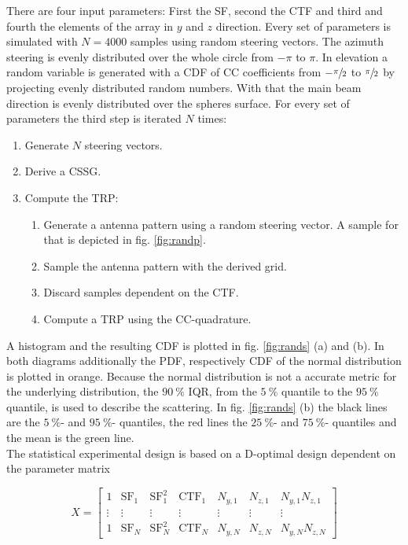 There are four input parameters: First the \ac{SF}, second the \ac{CTF} and third and fourth the elements of the array in $y$ and $z$ direction. Every set of parameters is simulated with $N=4000$ samples using random steering vectors. The azimuth steering is evenly distributed over the whole circle from $-\pi$ to $\pi$. In elevation a random variable is generated with a \ac{CDF} of \ac{CC} coefficients from $-\sfrac{\pi}{2}$ to $\sfrac{\pi}{2}$ by projecting evenly distributed random numbers. With that the main beam direction is evenly distributed over the spheres surface. For every set of parameters the third step is iterated $N$ times:

\begin{enumerate}
\item Generate $N$ steering vectors.
\item Derive a \ac{CSSG}.
\item Compute the \ac{TRP}:
\begin{enumerate}
\item Generate a antenna pattern using a random steering vector. A sample for that is depicted in fig. \ref{fig:randp}.
\item Sample the antenna pattern with the derived grid.
\item Discard samples dependent on the \ac{CTF}.
\item Compute a \ac{TRP} using the \ac{CC}-quadrature.
\end{enumerate}
\end{enumerate}

A histogram and the resulting \ac{CDF} is plotted in fig. \ref{fig:rands} (a) and (b). In both diagrams additionally the \ac{PDF}, respectively \ac{CDF} of the normal distribution is plotted in orange. Because the normal distribution is not a accurate metric for the underlying distribution, the $\SI{90}{\percent}$ \ac{IQR}, from the $\SI{5}{\percent}$ quantile to the $\SI{95}{\percent}$ quantile, is used to describe the scattering. In fig. \ref{fig:rands} (b) the black lines are the $\SI{5}{\percent}$- and $\SI{95}{\percent}$- quantiles, the red lines the $\SI{25}{\percent}$- and $\SI{75}{\percent}$- quantiles and the mean is the green line.\\
The statistical experimental design is based on a D-optimal design dependent on the parameter matrix

\begin{equation}
X = \begin{bmatrix}
1 & \text{SF}_1 & \text{SF}_1^2 & \text{CTF}_1 & N_{y,1} & N_{z,1} & N_{y,1}N_{z,1}\\
\vdots & \vdots & \vdots & \vdots & \vdots & \vdots & \vdots\\
1 & \text{SF}_N & \text{SF}_N^2 & \text{CTF}_N & N_{y,N} & N_{z,N} & N_{y,N}N_{z,N}
\end{bmatrix}
\label{eq:parammatrix}
\end{equation}

